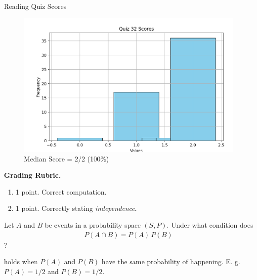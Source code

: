 \documentclass[10pt]{beamer}
\begin{document}
\begin{frame}{Reading Quiz Scores}
\footnotesize 
\begin{figure}[ht]
        \centering
        \includegraphics[width=.8\textwidth]{images/reading_quiz_scores}
   		 \caption{Median Score = 2/2 (100\%)}
\end{figure}
\vfill 
\textbf{Grading Rubric.}  	
\begin{enumerate}
\item 1 point.  Correct computation.
\item 1 point. Correctly stating \textit{independence}.
\end{enumerate}
\end{frame}	


\begin{frame}

\begin{mygreenbox}[title=\text{Reminder: Reading Quiz (Conditional Probability and Independence)}]
Let $A$ and $B$ be events in a probability space $(S,P)$.  Under what condition does
\begin{align}
P(A \cap B) = P(A) \, P(B)
\label{eqn:independence}
\end{align}
?
\end{mygreenbox}
\vfill 

\begin{myyellowbox}[title=\text{Poll: What do you think about this answer?}]

 holds  when $P(A)$ and $P(B)$ have the same probability of happening.  E. g. $P(A)=1/2$ and $P(B)=1/2$.
\end{myyellowbox}

\end{frame}
\end{document}
